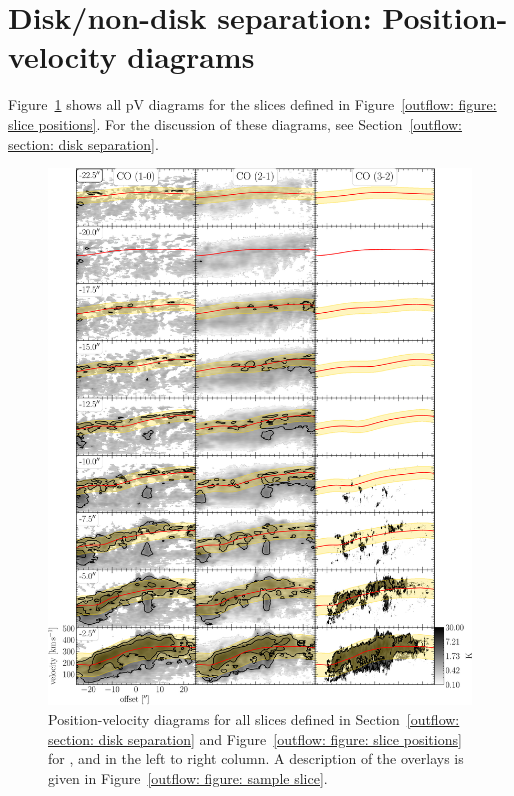 
\section{Disk/non-disk separation: Position-velocity diagrams}
\label{appendix: outflow: all pVs}

Figure~\ref{outflow: figure: all pV diagrams} shows all pV diagrams for the slices defined in Figure~\ref{outflow: figure: slice positions}. For the discussion of these diagrams, see Section~\ref{outflow: section: disk separation}.

\vspace{0.5cm}

\begin{figure}[ht!]
	\centering
	\includegraphics[width=\textwidth]{images/chapters/papers/outflow/outflow_figC1a.pdf}
	\caption[Complete list of pV slices]{Position-velocity diagrams for all slices defined in Section~\ref{outflow: section: disk separation} and Figure~\ref{outflow: figure: slice positions} for ,  and  in the left to right column. A description of the overlays is given in Figure~\ref{outflow: figure: sample slice}.}
	\label{outflow: figure: all pV diagrams}
\end{figure}

